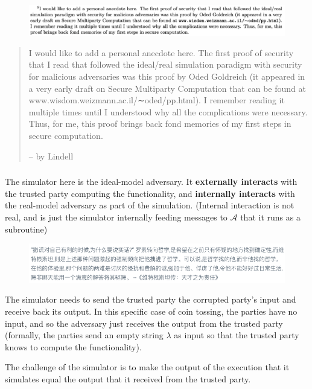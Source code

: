 \documentclass{beamer}
\begin{document}
    \begin{frame}
        \frametitle{}
    
        \begin{figure}[]
            \includegraphics[scale=0.25]{blum.png}
        \end{figure}

        \begin{quote}
            I would like to add a personal anecdote here. The first proof of security that I read that followed the ideal/real simulation paradigm with security for malicious adversaries was this proof by Oded Goldreich (it appeared in a very early draft on Secure Multiparty Computation that can be found at www.wisdom.weizmann.ac.il/∼oded/pp.html). I remember reading it multiple times until I understood why all the complications were necessary. Thus, for me, this proof brings back fond memories of my first steps in secure computation. 
        
            -- by Lindell
        \end{quote}

       

    
    \end{frame}
    \begin{frame}
        \frametitle{}

        The simulator here is the ideal-model adversary. It \textbf{externally interacts} with the trusted party computing the functionality, and \textbf{internally interacts} with the real-model adversary as part of the simulation. (Internal interaction is not real, and is just the simulator internally feeding messages to $\mathcal{A}$ that it runs as a subroutine)
        
        \begin{figure}[]
            \includegraphics[scale=0.4]{wittgenstein.png}
        \end{figure}

        The simulator needs to send the trusted party the corrupted party's input and receive back its output. In this specific case of coin tossing, the parties have no input, and so the adversary just receives the output from the trusted party (formally, the parties send an empty string $\lambda$ as input so that the trusted party knows to compute the functionality). 
 
        The challenge of the simulator is to make the output of the execution that it simulates equal the output that it received from the trusted party.
        
    \end{frame}
\end{document}
